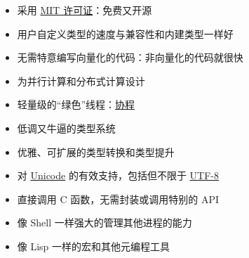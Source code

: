 \begin{itemize}
\item 采用 \href{https://github.com/JuliaLang/julia/blob/master/LICENSE.md}{MIT 许可证}：免费又开源


\item 用户自定义类型的速度与兼容性和内建类型一样好


\item 无需特意编写向量化的代码：非向量化的代码就很快


\item 为并行计算和分布式计算设计


\item 轻量级的“绿色”线程：\href{https://discourse.juliacn.com/t/topic/4203\#coroutine}{协程}


\item 低调又牛逼的类型系统


\item 优雅、可扩展的类型转换和类型提升


\item 对 \href{https://discourse.juliacn.com/t/topic/4203\#unicode}{Unicode} 的有效支持，包括但不限于 \href{https://discourse.juliacn.com/t/topic/4203\#utf-8}{UTF-8}


\item 直接调用 C 函数，无需封装或调用特别的 API


\item 像 Shell 一样强大的管理其他进程的能力


\item 像 Lisp 一样的宏和其他元编程工具

\end{itemize}
